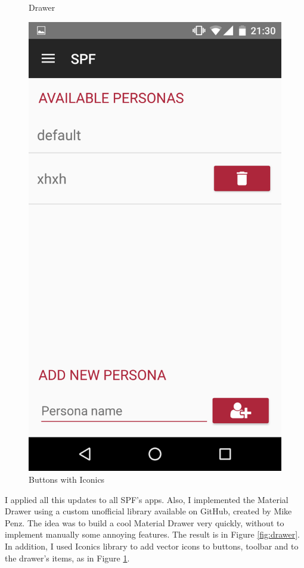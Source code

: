 \begin{figure}[thpb]
\begin{minipage}[b]{0.4\textwidth}
	\caption{Drawer}
	\label{fig:drawer}
\end{minipage}
\hfill
\begin{minipage}[b]{0.4\textwidth}
	\centering
	\includegraphics[scale=0.1]{./images/chap3/bottom_iconics.png}
	\caption{Buttons with Iconics}
	\label{fig:buttom-iconics}
\end{minipage}	
\end{figure}	

I applied all this updates to all SPF's apps. Also, I implemented the \textsf{Material Drawer} using a custom unofficial library available on GitHub, created by Mike Penz. The idea was to build a cool Material Drawer very quickly, without to implement manually some annoying features. The result is in Figure \ref{fig:drawer}. In addition, I used \textsf{Iconics} library to add vector icons to buttons, toolbar and to the drawer's items, as in Figure \ref{fig:buttom-iconics}.

